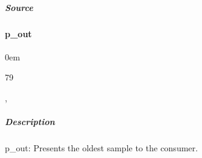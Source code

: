 \documentclass[letterpaper,10pt,english]{sphinxmanual}
\begin{document}
\subparagraph{Source}
\label{\detokenize{modules/sample_capture/processes/p_ctrl:source}}
\begin{sphinxVerbatim}[commandchars=\\\{\}]
\end{sphinxVerbatim}

\sphinxstepscope


\paragraph{p\_out}
\label{\detokenize{modules/sample_capture/processes/p_out:p-out}}\label{\detokenize{modules/sample_capture/processes/p_out::doc}}
\begin{DUlineblock}{0em}
\item[]  
\item[]  79
\item[]  
\item[]  , 
\end{DUlineblock}


\subparagraph{Description}
\label{\detokenize{modules/sample_capture/processes/p_out:description}}
\sphinxAtStartPar
p\_out: Presents the oldest sample to the consumer.
\end{document}
